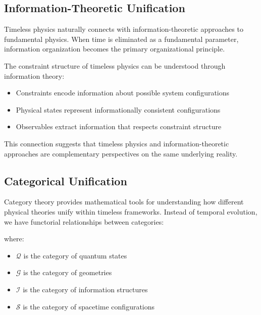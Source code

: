 \documentclass[12pt,a4paper]{article}
\begin{document}
\subsection{Information-Theoretic Unification}

Timeless physics naturally connects with information-theoretic approaches to fundamental physics. When time is eliminated as a fundamental parameter, information organization becomes the primary organizational principle.

The constraint structure of timeless physics can be understood through information theory:
\begin{itemize}
\item Constraints encode information about possible system configurations
\item Physical states represent informationally consistent configurations
\item Observables extract information that respects constraint structure
\end{itemize}

This connection suggests that timeless physics and information-theoretic approaches are complementary perspectives on the same underlying reality.

\subsection{Categorical Unification}

Category theory provides mathematical tools for understanding how different physical theories unify within timeless frameworks. Instead of temporal evolution, we have functorial relationships between categories:


where:
\begin{itemize}
\item $\mathcal{Q}$ is the category of quantum states
\item $\mathcal{G}$ is the category of geometries
\item $\mathcal{I}$ is the category of information structures
\item $\mathcal{S}$ is the category of spacetime configurations
\end{itemize}
\end{document}

